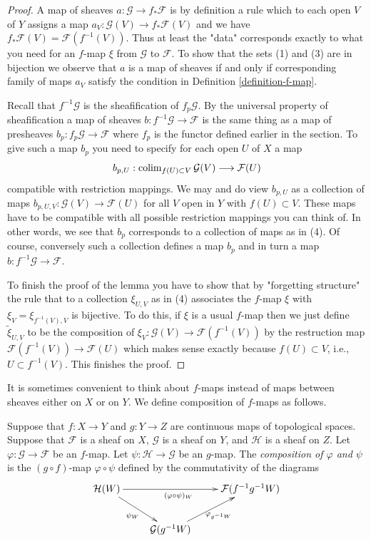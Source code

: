 \begin{proof}
A map of sheaves $a : \mathcal{G} \to f_*\mathcal{F}$
is by definition a rule which to each open $V$ of $Y$ assigns
a map $a_V : \mathcal{G}(V) \to f_*\mathcal{F}(V)$
and we have $f_*\mathcal{F}(V) = \mathcal{F}(f^{-1}(V))$.
Thus at least the "data" corresponds exactly to what you need
for an $f$-map $\xi$ from $\mathcal{G}$ to $\mathcal{F}$.
To show that the sets (1) and (3) are in bijection we observe that
$a$ is a map of sheaves if and only if corresponding family of maps $a_V$
satisfy the condition in Definition \ref{definition-f-map}.

\medskip\noindent
Recall that $f^{-1}\mathcal{G}$ is the sheafification of $f_p\mathcal{G}$.
By the universal property of sheafification a map of sheaves
$b : f^{-1}\mathcal{G} \to \mathcal{F}$ is the same thing as a map of
presheaves $b_p : f_p\mathcal{G} \to \mathcal{F}$ where $f_p$ is the
functor defined earlier in the section. To give such a map $b_p$
you need to specify for each open $U$ of $X$ a map
$$
b_{p, U} :
\mathop{\mathrm{colim}}\nolimits_{f(U) \subset V} \mathcal{G}(V)
\longrightarrow
\mathcal{F}(U)
$$
compatible with restriction mappings. We may and do view $b_{p, U}$
as a collection of maps $b_{p, U, V} : \mathcal{G}(V) \to \mathcal{F}(U)$
for all $V$ open in $Y$ with $f(U) \subset V$. These maps have to be
compatible with all possible restriction mappings you can think of.
In other words, we see that $b_p$ corresponds to a collection of maps
as in (4). Of course, conversely such a collection defines a map
$b_p$ and in turn a map $b : f^{-1}\mathcal{G} \to \mathcal{F}$.

\medskip\noindent
To finish the proof of the lemma you have to show that by
"forgetting structure" the rule that to a collection $\xi_{U, V}$
as in (4) associates the $f$-map $\xi$ with $\xi_V = \xi_{f^{-1}(V), V}$
is bijective. To do this, if $\xi$ is a usual $f$-map then we just
define $\tilde \xi_{U, V}$ to be the composition of
$\xi_V : \mathcal{G}(V) \to \mathcal{F}(f^{-1}(V))$
by the restruction map $\mathcal{F}(f^{-1}(V)) \to \mathcal{F}(U)$
which makes sense exactly because $f(U) \subset V$, i.e.,
$U \subset f^{-1}(V)$. This finishes the proof.
\end{proof}

\noindent
It is sometimes convenient to think about $f$-maps
instead of maps between sheaves either on $X$ or on $Y$.
We define composition of $f$-maps as follows.

\begin{definition}
\label{definition-composition-f-maps}
Suppose that $f : X \to Y$ and $g : Y \to Z$ are continuous
maps of topological spaces. Suppose that $\mathcal{F}$ is
a sheaf on $X$, $\mathcal{G}$ is a sheaf on $Y$, and
$\mathcal{H}$ is a sheaf on $Z$.
Let $\varphi : \mathcal{G} \to \mathcal{F}$ be an $f$-map.
Let $\psi : \mathcal{H} \to \mathcal{G}$ be an $g$-map.
The {\it composition of $\varphi$ and $\psi$} is the
$(g \circ f)$-map $\varphi \circ \psi$ defined
by the commutativity of the diagrams
$$
\xymatrix{
\mathcal{H}(W) \ar[rr]_{(\varphi \circ \psi)_W}
\ar[rd]_{\psi_W} & &
\mathcal{F}(f^{-1}g^{-1}W) \\
&
\mathcal{G}(g^{-1}W)
\ar[ru]_{\varphi_{g^{-1}W}}
}
$$
\end{definition}

